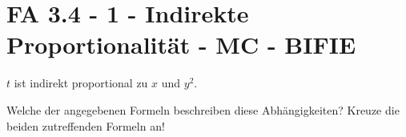 \section{FA 3.4 - 1 - Indirekte Proportionalität - MC - BIFIE}

\begin{beispiel}[FA 3.4]{1} %
$t$ ist indirekt proportional zu $x$ und $y^2$.

Welche der angegebenen Formeln beschreiben diese Abhängigkeiten? Kreuze die beiden zutreffenden Formeln an!
\end{beispiel}
